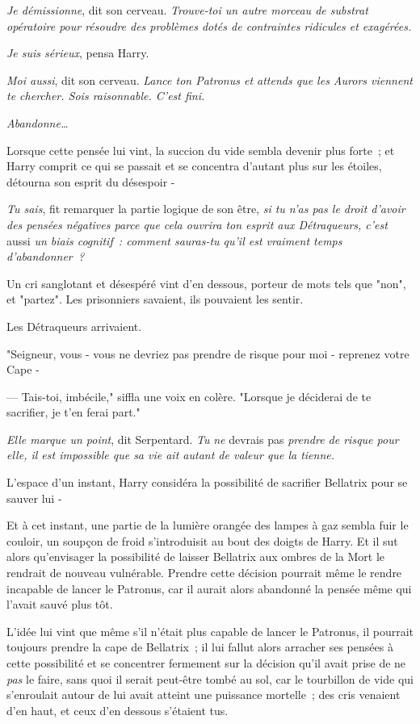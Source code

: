 \emph{Je démissionne}, dit son cerveau. \emph{Trouve-toi un autre morceau de substrat opératoire pour résoudre des problèmes dotés de contraintes ridicules et exagérées.}

\emph{Je suis sérieux}, pensa Harry.

\emph{Moi aussi}, dit son cerveau. \emph{Lance ton Patronus et attends que les Aurors viennent te chercher. Sois raisonnable. C'est fini.}

\emph{Abandonne…}

Lorsque cette pensée lui vint, la succion du vide sembla devenir plus forte~; et Harry comprit ce qui se passait et se concentra d'autant plus sur les étoiles, détourna son esprit du désespoir -

\emph{Tu sais}, fit remarquer la partie logique de son être, \emph{si tu n'as pas le droit d'avoir des pensées négatives parce que cela ouvrira ton esprit aux Détraqueurs, c'est} aussi \emph{un biais cognitif~: comment sauras-tu qu'il est vraiment temps d'abandonner~?}

Un cri sanglotant et désespéré vint d'en dessous, porteur de mots tels que "non", et "partez". Les prisonniers savaient, ils pouvaient les sentir.

Les Détraqueurs arrivaient.

"Seigneur, vous - vous ne devriez pas prendre de risque pour moi - reprenez votre Cape -

--- Tais-toi, imbécile," siffla une voix en colère. "Lorsque je déciderai de te sacrifier, je t'en ferai part."

\emph{Elle marque un point}, dit Serpentard. \emph{Tu} \emph{ne} devrais pas \emph{prendre de risque pour elle, il est impossible que sa vie ait autant de valeur que la tienne.}

L'espace d'un instant, Harry considéra la possibilité de sacrifier Bellatrix pour se sauver lui -

Et à cet instant, une partie de la lumière orangée des lampes à gaz sembla fuir le couloir, un soupçon de froid s'introduisit au bout des doigts de Harry. Et il sut alors qu'envisager la possibilité de laisser Bellatrix aux ombres de la Mort le rendrait de nouveau vulnérable. Prendre cette décision pourrait même le rendre incapable de lancer le Patronus, car il aurait alors abandonné la pensée même qui l'avait sauvé plus tôt.

L'idée lui vint que même s'il n'était plus capable de lancer le Patronus, il pourrait toujours prendre la cape de Bellatrix~; il lui fallut alors arracher ses pensées à cette possibilité et se concentrer fermement sur la décision qu'il avait prise de ne \emph{pas} le faire, sans quoi il serait peut-être tombé au sol, car le tourbillon de vide qui s'enroulait autour de lui avait atteint une puissance mortelle~; des cris venaient d'en haut, et ceux d'en dessous s'étaient tus.

